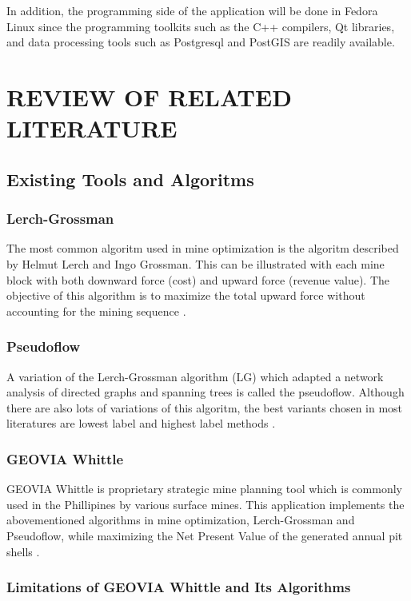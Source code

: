 \documentclass[12pt]{report}
\begin{document}
In addition, the programming side of the application will be done in Fedora Linux \cite{fedora} since the programming toolkits such as the C++ compilers, Qt libraries, and data processing tools such as Postgresql \cite{postgres} and PostGIS \cite{postgis} are readily available.

\chapter{REVIEW OF RELATED LITERATURE}

\section{Existing Tools and Algoritms}

\subsection{Lerch-Grossman}

The most common algoritm used in mine optimization is the algoritm described by Helmut Lerch and Ingo Grossman.
This can be illustrated with each mine block with both downward force (cost) and upward force (revenue value).
The objective of this algorithm is to maximize the total upward force without accounting for the mining sequence \cite{IMS}.

\subsection{Pseudoflow}

A variation of the Lerch-Grossman algorithm (LG) which adapted a network analysis of directed graphs and spanning trees is called the pseudoflow.
Although there are also lots of variations of this algoritm, the best variants chosen in most literatures are lowest label and highest label methods \cite{pseudoflow}.

\subsection{GEOVIA Whittle}

GEOVIA Whittle is proprietary strategic mine planning tool which is commonly used in the Phillipines by various surface mines.
This application implements the abovementioned algorithms in mine optimization, Lerch-Grossman and Pseudoflow, while maximizing the Net Present Value of the generated annual pit shells \cite{whittle}.

\subsection{Limitations of GEOVIA Whittle and Its Algorithms}
\end{document}

